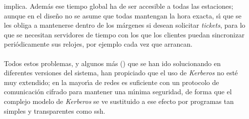 implica. Adem\'as ese tiempo global ha de ser accesible a todas las estaciones;
aunque en el dise\~no no se asume que todas mantengan la hora exacta, s\'{\i} 
que se les obliga a mantenerse dentro de los m\'argenes si desean solicitar
{\it tickets}, para lo que se necesitan servidores de tiempo con los que los
clientes puedan sincronizar peri\'odicamente sus relojes, por ejemplo cada
vez que arrancan.\\
\\Todos estos problemas, y algunos m\'as (\cite{kn:bel91}) que se han ido 
solucionando en diferentes versiones del sistema, han propiciado que el uso de 
{\it Kerberos} no est\'e muy extendido; en la mayor\'{\i}a de redes es 
suficiente con un protocolo de comunicaci\'on cifrado para mantener una 
m\'{\i}nima seguridad, de forma que el complejo modelo de {\it Kerberos} se ve 
sustituido a ese efecto por programas tan simples y transparentes como {\sc 
ssh}.

